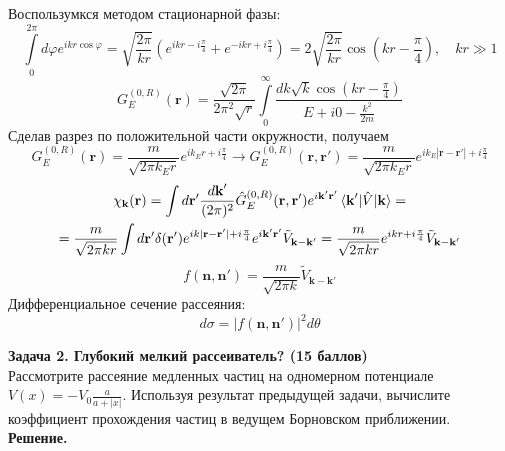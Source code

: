 \documentclass[12pt]{article}
\theoremstyle{definition}
\begin{document}
\begin{enumerate}
\begin{equation}
    \end{equation}
    Воспользумкся методом стационарной фазы:
    \begin{equation}
        \int\limits_0^{2\pi} d\varphi e^{ikr\cos\varphi}=\sqrt{\frac{2\pi}{kr}}(e^{ikr-i\frac{\pi}{4}}+e^{-ikr+i\frac{\pi}{4}})=2\sqrt{\frac{2\pi}{kr}}\cos\left(kr-\frac{\pi}{4}\right),\quad kr\gg1
    \end{equation}
    \begin{equation}
        G^{(0,R)}_E(\textbf{r})=\frac{\sqrt{2\pi}}{2\pi^2\sqrt{r}}\int\limits_0^\infty \frac{dk\sqrt{k}\cos\left(kr-\frac{\pi}{4}\right)}{E+i0-\frac{k^2}{2m}}
    \end{equation}
    Сделав разрез по положительной части окружности, получаем
    \begin{equation}
        G^{(0,R)}_E(\textbf{r})=\frac{m}{\sqrt{2\pi k_Er}}e^{ik_Er+i\frac{\pi}{4}}\rightarrow G^{(0,R)}_E(\textbf{r},\textbf{r}')=\frac{m}{\sqrt{2\pi k_Er}}e^{ik_E|\textbf{r}-\textbf{r}'|+i\frac{\pi}{4}}
    \end{equation}
    \begin{multline}
        \chi_{\textbf{k}}(\textbf{r})=\int d\textbf{r}'\frac{d\textbf{k}'}{(2\pi)^2}\hat{G}^{(0,R)}_E(\textbf{r},\textbf{r}')e^{i\textbf{k}'\textbf{r}'}\braket{\textbf{k}'|\hat{V}|\textbf{k}}=\\=\frac{m}{\sqrt{2\pi kr}}\int d\textbf{r}'\delta(\textbf{r}')e^{ik|\textbf{r}-\textbf{r}'|+i\frac{\pi}{4}}e^{i\textbf{k}'\textbf{r}'}\tilde{V}_{\textbf{k}-\textbf{k}'}=\frac{m}{\sqrt{2\pi kr}}e^{ikr+i\frac{\pi}{4}}\tilde{V}_{\textbf{k}-\textbf{k}'}
    \end{multline}
    \begin{equation}
        \boxed{f(\textbf{n},\textbf{n}')=\frac{m}{\sqrt{2\pi k}}\tilde{V}_{\textbf{k}-\textbf{k}'}}
    \end{equation}
    Дифференциальное сечение рассеяния:
    \begin{equation}
        \boxed{d\sigma=|f(\textbf{n},\textbf{n}')|^2d\theta}
    \end{equation}
\end{enumerate}
\textbf{Задача 2. Глубокий мелкий рассеиватель? (15 баллов)}\\
Рассмотрите рассеяние медленных частиц на одномерном потенциале $V(x) = -V_0\frac{a}{a+|x|}$. Используя результат предыдущей задачи, вычислите коэффициент прохождения частиц в ведущем Борновском приближении.\\
\textbf{Решение.}\\
\end{document}
